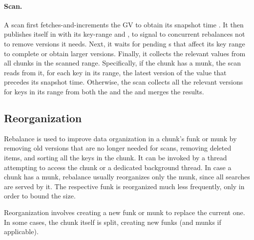 \paragraph{Scan.}
A scan first fetches-and-increments the GV to obtain its snapshot time . 
 It then publishes itself in  with its key-range and , to 
 signal to concurrent rebalances not to remove versions it needs. Next, it waits for pending
 s that affect its key range to complete or obtain larger versions. %
Finally, it collects the relevant values from all chunks in the scanned range.
Specifically, if the chunk has a munk, the scan reads from it, for each key in its range, 
the latest version of the value that precedes its snapshot time.
Otherwise, the scan collects all the relevant versions for keys in its range from both 
the    and the  and merges the results.
 

\subsection{Reorganization}
\label{ssec:rebalance}


Rebalance is used to improve data organization in a chunk's funk or munk by removing old versions that are no longer needed for scans, 
removing deleted items, and sorting all the keys in the chunk. 
It can be invoked by a thread attempting to access the chunk or a dedicated background thread.
In case a chunk has a munk, rebalance usually reorganizes only  the munk, since all searches are served by it. 
The respective funk is reorganized much less frequently, only in order to bound the  size. 

Reorganization involves creating a new funk or munk  to replace the  current one.  In some cases, the chunk itself is split, creating new funks (and munks if applicable). 

